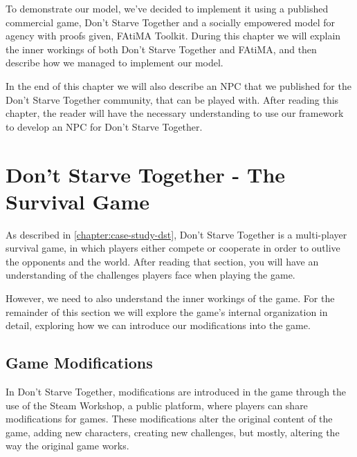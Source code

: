 \cleardoublepage
\label{chapter:implementation}

\noindent To demonstrate our model, we've decided to implement it using a published commercial game, Don't Starve Together and a socially empowered model for agency with proofs given, \ac{FAtiMA} Toolkit.
During this chapter we will explain the inner workings of both Don't Starve Together and \ac{FAtiMA}, and then describe how we managed to implement our model.

In the end of this chapter we will also describe an \ac{NPC} that we published for the Don't Starve Together community, that can be played with.
After reading this chapter, the reader will have the necessary understanding to use our framework to develop an \ac{NPC} for Don't Starve Together.

\section{Don't Starve Together - The Survival Game}

\noindent As described in \ref{chapter:case-study-dst}, Don't Starve Together is a multi-player survival game, in which players either compete or cooperate in order to outlive the opponents and the world.
After reading that section, you will have an understanding of the challenges players face when playing the game.

However, we need to also understand the inner workings of the game.
For the remainder of this section we will explore the game's internal organization in detail, exploring how we can introduce our modifications into the game.

\subsection{Game Modifications}

\noindent In Don't Starve Together, modifications are introduced in the game through the use of the Steam Workshop, a public platform, where players can share modifications for games.
These modifications alter the original content of the game, adding new characters, creating new challenges, but mostly, altering the way the original game works.

